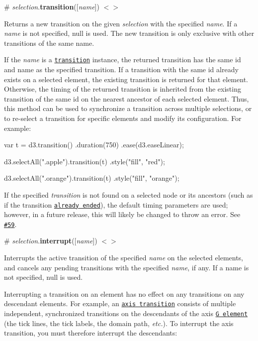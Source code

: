 \label{_selection_transition}%
\# {\itshape selection}.{\bfseries transition}(\mbox{[}{\itshape name}\mbox{]}) \href{https://github.com/d3/d3-transition/blob/master/src/selection/transition.js}{\tt $<$$>$}

Returns a new transition on the given {\itshape selection} with the specified {\itshape name}. If a {\itshape name} is not specified, null is used. The new transition is only exclusive with other transitions of the same name.

If the {\itshape name} is a \href{#transition}{\tt transition} instance, the returned transition has the same id and name as the specified transition. If a transition with the same id already exists on a selected element, the existing transition is returned for that element. Otherwise, the timing of the returned transition is inherited from the existing transition of the same id on the nearest ancestor of each selected element. Thus, this method can be used to synchronize a transition across multiple selections, or to re-\/select a transition for specific elements and modify its configuration. For example\+:


\begin{DoxyCode}
var t = d3.transition()
    .duration(750)
    .ease(d3.easeLinear);

d3.selectAll(".apple").transition(t)
    .style("fill", "red");

d3.selectAll(".orange").transition(t)
    .style("fill", "orange");
\end{DoxyCode}


If the specified {\itshape transition} is not found on a selected node or its ancestors (such as if the transition \href{#the-life-of-a-transition}{\tt already ended}), the default timing parameters are used; however, in a future release, this will likely be changed to throw an error. See \href{https://github.com/d3/d3-transition/issues/59}{\tt \#59}.

\label{_selection_interrupt}%
\# {\itshape selection}.{\bfseries interrupt}(\mbox{[}{\itshape name}\mbox{]}) \href{https://github.com/d3/d3-transition/blob/master/src/selection/interrupt.js}{\tt $<$$>$}

Interrupts the active transition of the specified {\itshape name} on the selected elements, and cancels any pending transitions with the specified {\itshape name}, if any. If a name is not specified, null is used.

Interrupting a transition on an element has no effect on any transitions on any descendant elements. For example, an \href{https://github.com/d3/d3-axis}{\tt axis transition} consists of multiple independent, synchronized transitions on the descendants of the axis \href{https://www.w3.org/TR/SVG/struct.html#Groups}{\tt G element} (the tick lines, the tick labels, the domain path, {\itshape etc.}). To interrupt the axis transition, you must therefore interrupt the descendants\+:


